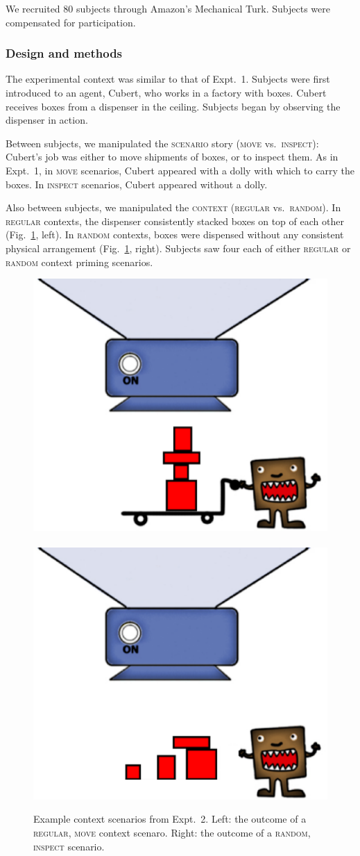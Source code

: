 \documentclass[linguex]{sp}
\begin{document}
We recruited 80 subjects through Amazon's Mechanical Turk. Subjects were compensated for participation.

\subsubsection{Design and methods}

The experimental context was similar to that of Expt.~1. Subjects were first introduced to an agent, Cubert, who works in a factory with boxes. Cubert receives boxes from a dispenser in the ceiling. Subjects began by observing the dispenser in action.

Between subjects, we manipulated the \textsc{scenario} story (\textsc{move} vs.\ \textsc{inspect}): Cubert's job was either to move shipments of boxes, or to inspect them. As in Expt.~1, in \textsc{move} scenarios, Cubert appeared with a dolly with which to carry the boxes. In \textsc{inspect} scenarios, Cubert appeared without a dolly.

Also between subjects, we manipulated the \textsc{context} (\textsc{regular} vs.\ \textsc{random}). In \textsc{regular} contexts, the dispenser consistently stacked boxes on top of each other (Fig.\ \ref{expt2context}, left). In \textsc{random} contexts, boxes were dispensed without any consistent physical arrangement (Fig.\ \ref{expt2context}, right). Subjects saw four each of either \textsc{regular} or \textsc{random} context priming scenarios.

\begin{figure}[h]
\centering
\includegraphics[width=.45\textwidth]{images/context13reg.eps}
\ \ \ \ 
\includegraphics[width=.45\textwidth]{images/context13nodolly.eps}
\caption{Example context scenarios from Expt.~2. Left: the outcome of a \textsc{regular}, \textsc{move} context scenaro. Right: the outcome of a \textsc{random}, \textsc{inspect} scenario.\label{expt2context}}
\end{figure}
\end{document}
